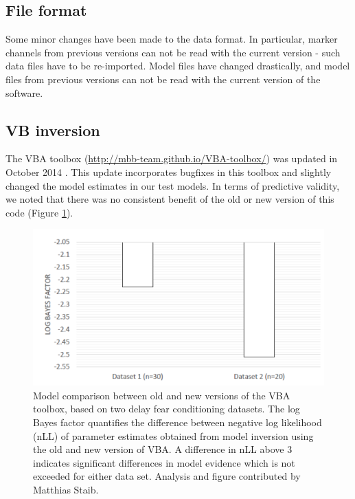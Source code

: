 \documentclass[english]{article}
\numberwithin{equation}{section}
\numberwithin{figure}{section}
\begin{document}
\subsection*{File format}

Some minor changes have been made to the data format. In particular,
marker channels from previous versions can not be read with the current
version - such data files have to be re-imported. Model files have
changed drastically, and model files from previous versions can not
be read with the current version of the software.

\subsection*{VB inversion}

The VBA toolbox (\url{http://mbb-team.github.io/VBA-toolbox/}) was
updated in October 2014 \cite{Daunizeau:2014aa}. This update incorporates
bugfixes in this toolbox and slightly changed the model estimates
in our test models. In terms of predictive validity, we noted that
there was no consistent benefit of the old or new version of this
code (Figure \ref{fig:VBA}).

\begin{figure}
\includegraphics[scale=0.85]{Figures/Comparison_VBA}\caption{Model comparison between old and new versions of the VBA toolbox,
based on two delay fear conditioning datasets. The log Bayes factor
quantifies the difference between negative log likelihood (nLL) of
parameter estimates obtained from model inversion using the old and
new version of VBA. A difference in nLL above 3 indicates significant
differences in model evidence which is not exceeded for either data
set. Analysis and figure contributed by Matthias Staib. \label{fig:VBA}}
\end{figure}
\end{document}
